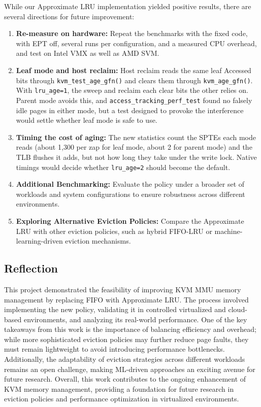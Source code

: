 \documentclass[letterpaper,twocolumn,10pt]{article}
\begin{document}
While our Approximate LRU implementation yielded positive results, there are
several directions for future improvement:

\begin{enumerate}[leftmargin=*,itemsep=2pt,topsep=2pt]
    \item \textbf{Re-measure on hardware:} Repeat the benchmarks with the fixed
          code, with EPT off, several runs per configuration, and a measured CPU
          overhead, and test on Intel VMX as well as AMD SVM.
    \item \textbf{Leaf mode and host reclaim:} Host reclaim reads the same
          leaf Accessed bits through \texttt{kvm\_test\_age\_gfn()} and clears
          them through \texttt{kvm\_age\_gfn()}. With \texttt{lru\_age=1}, the
          sweep and reclaim each clear bits the other relies on. Parent mode
          avoids this, and \texttt{access\_tracking\_perf\_test} found no
          falsely idle pages in either mode, but a test designed to provoke the
          interference would settle whether leaf mode is safe to use.
    \item \textbf{Timing the cost of aging:} The new statistics count the SPTEs
          each mode reads (about 1{,}300 per zap for leaf mode, about 2 for
          parent mode) and the TLB flushes it adds, but not how long they take
          under the write lock. Native timings would decide whether
          \texttt{lru\_age=2} should become the default.
    \item \textbf{Additional Benchmarking:} Evaluate the policy under a broader set
          of workloads and system configurations to ensure robustness across
          different environments.
    \item \textbf{Exploring Alternative Eviction Policies:} Compare the Approximate
          LRU with other eviction policies, such as hybrid FIFO-LRU or
          machine-learning-driven eviction mechanisms.
\end{enumerate}

\subsection{Reflection}

This project demonstrated the feasibility of improving KVM MMU memory management by
replacing FIFO with Approximate LRU. The process involved implementing the new
policy, validating it in controlled virtualized and cloud-based environments, and
analyzing its real-world performance. One of the key takeaways from this work is
the importance of balancing efficiency and overhead; while more sophisticated
eviction policies may further reduce page faults, they must remain lightweight to
avoid introducing performance bottlenecks. Additionally, the adaptability of
eviction strategies across different workloads remains an open challenge, making
ML-driven approaches an exciting avenue for future research. Overall, this work
contributes to the ongoing enhancement of KVM memory management, providing a
foundation for future research in eviction policies and performance optimization
in virtualized environments.
\end{document}
